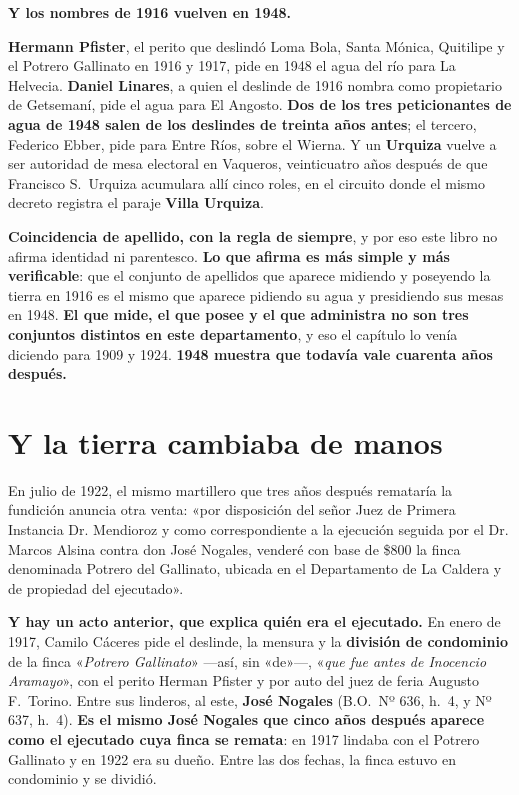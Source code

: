 \begin{cautela}
\textbf{Y los nombres de 1916 vuelven en 1948.}

\textbf{Hermann Pfister}, el perito que deslindó Loma Bola, Santa Mónica, Quitilipe y el
Potrero Gallinato en 1916 y 1917, pide en 1948 el agua del río para La Helvecia.
\textbf{Daniel Linares}, a quien el deslinde de 1916 nombra como propietario de Getsemaní,
pide el agua para El Angosto. \textbf{Dos de los tres peticionantes de agua de 1948 salen de los
deslindes de treinta años antes}; el tercero, Federico Ebber, pide para Entre Ríos, sobre el Wierna. Y un \textbf{Urquiza} vuelve a ser autoridad de mesa
electoral en Vaqueros, veinticuatro años después de que Francisco S.\ Urquiza acumulara allí
cinco roles, en el circuito donde el mismo decreto registra el paraje \textbf{Villa Urquiza}.

\textbf{Coincidencia de apellido, con la regla de siempre}, y por eso este libro no afirma
identidad ni parentesco. \textbf{Lo que afirma es más simple y más verificable}: que el
conjunto de apellidos que aparece midiendo y poseyendo la tierra en 1916 es el mismo que
aparece pidiendo su agua y presidiendo sus mesas en 1948. \textbf{El que mide, el que posee y
el que administra no son tres conjuntos distintos en este departamento}, y eso el capítulo lo
venía diciendo para 1909 y 1924. \textbf{1948 muestra que todavía vale cuarenta años
después.}
\end{cautela}


\section{Y la tierra cambiaba de manos}

En julio de 1922, el mismo martillero que tres años después remataría la fundición anuncia
otra venta: «por disposición del señor Juez de Primera Instancia Dr. Mendioroz y como
correspondiente a la ejecución seguida por el Dr. Marcos Alsina contra don José Nogales,
venderé con base de \$800 la finca denominada Potrero del Gallinato, ubicada en el
Departamento de La Caldera y de propiedad del ejecutado».

\textbf{Y hay un acto anterior, que explica quién era el ejecutado.} En enero de 1917, Camilo
Cáceres pide el deslinde, la mensura y la \textbf{división de condominio} de la finca «\textit{Potrero
Gallinato}» ---así, sin «de»---, «\textit{que fue antes de Inocencio Aramayo}», con el perito Herman
Pfister y por auto del juez de feria Augusto F.\ Torino. Entre sus linderos, al
este, \textbf{José Nogales} (B.O.\ Nº 636, h.\ 4, y Nº 637, h.\ 4). \textbf{Es el mismo José Nogales
que cinco años después aparece como el ejecutado cuya finca se remata}: en 1917 lindaba con el Potrero
Gallinato y en 1922 era su dueño. Entre las dos fechas, la finca estuvo en condominio y se dividió.

